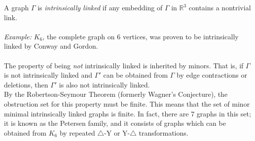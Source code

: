 \documentclass[12pt]{article}
\begin{document}
A graph $\Gamma$ is \emph{intrinsically linked} if any embedding of $\Gamma$ in $\mathbb{R}^3$ contains a nontrivial link. 
\\
\\\emph{Example:} $K_6$, the complete graph on 6 vertices, was proven to be intrinsically linked by Conway and Gordon.
\\
\\The property of being \emph{not} intrinsically linked is inherited by minors. That is, if $\Gamma$ is not intrinsically linked and $\Gamma'$ can be obtained from $\Gamma$ by edge contractions or deletions, then $\Gamma'$ is also not intrinsically linked.
\\By the Robertson-Seymour Theorem (formerly Wagner's Conjecture), the obstruction set for this property must be finite. This means that the set of minor minimal intrinsically linked graphs is finite. In fact, there are 7 graphs in this set; it is known as the Petersen family, and it consists of graphs which can be obtained from $K_6$ by repeated $\triangle$-Y or Y-$\triangle$ transformations.
\end{document}

